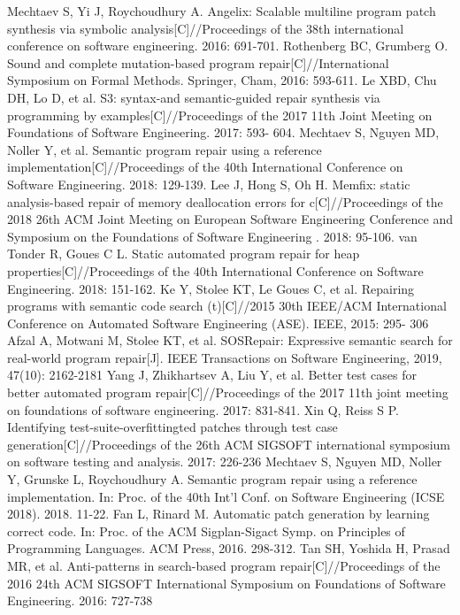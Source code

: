 \begin{thebibliography}{}
Mechtaev S, Yi J, Roychoudhury A. Angelix: Scalable multiline program patch synthesis via symbolic analysis[C]//Proceedings of the 38th international conference on software engineering. 2016: 691-701.
Rothenberg BC, Grumberg O. Sound and complete mutation-based program repair[C]//International Symposium on Formal Methods. Springer, Cham, 2016: 593-611.
Le XBD, Chu DH, Lo D, et al. S3: syntax-and semantic-guided repair synthesis via programming by examples[C]//Proceedings of the 2017 11th Joint Meeting on Foundations of Software Engineering. 2017: 593- 604.
Mechtaev S, Nguyen MD, Noller Y, et al. Semantic program repair using a reference implementation[C]//Proceedings of the 40th International Conference on Software Engineering. 2018: 129-139.
Lee J, Hong S, Oh H. Memfix: static analysis-based repair of memory deallocation errors for c[C]//Proceedings of the 2018 26th ACM Joint Meeting on European Software Engineering Conference and Symposium on the Foundations of Software Engineering . 2018: 95-106.
van Tonder R, Goues C L. Static automated program repair for heap properties[C]//Proceedings of the 40th International Conference on Software Engineering. 2018: 151-162.
Ke Y, Stolee KT, Le Goues C, et al. Repairing programs with semantic code search (t)[C]//2015 30th IEEE/ACM International Conference on Automated Software Engineering (ASE). IEEE, 2015: 295- 306
Afzal A, Motwani M, Stolee KT, et al. SOSRepair: Expressive semantic search for real-world program repair[J]. IEEE Transactions on Software Engineering, 2019, 47(10): 2162-2181
Yang J, Zhikhartsev A, Liu Y, et al. Better test cases for better automated program repair[C]//Proceedings of the 2017 11th joint meeting on foundations of software engineering. 2017: 831-841.
Xin Q, Reiss S P. Identifying test-suite-overfittingted patches through test case generation[C]//Proceedings of the 26th ACM SIGSOFT international symposium on software testing and analysis. 2017: 226-236
Mechtaev S, Nguyen MD, Noller Y, Grunske L, Roychoudhury A. Semantic program repair using a reference implementation. In: Proc. of the 40th Int'l Conf. on Software Engineering (ICSE 2018). 2018. 11-22.
Fan L, Rinard M. Automatic patch generation by learning correct code. In: Proc. of the ACM Sigplan-Sigact Symp. on Principles of Programming Languages. ACM Press, 2016. 298-312.
Tan SH, Yoshida H, Prasad MR, et al. Anti-patterns in search-based program repair[C]//Proceedings of the 2016 24th ACM SIGSOFT International Symposium on Foundations of Software Engineering. 2016: 727-738

\end{thebibliography}
